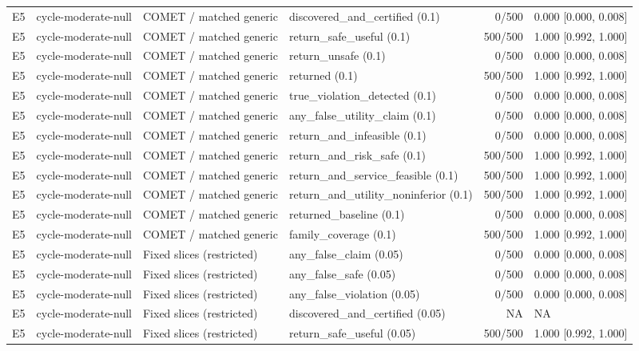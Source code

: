 \begin{longtable}{p{.04\linewidth}p{.18\linewidth}p{.19\linewidth}p{.16\linewidth}r p{.21\linewidth}}
E5 & cycle-moderate-null & COMET / matched generic & discovered\_and\_certified (0.1) & 0/500 & 0.000 [0.000, 0.008]\\
E5 & cycle-moderate-null & COMET / matched generic & return\_safe\_useful (0.1) & 500/500 & 1.000 [0.992, 1.000]\\
E5 & cycle-moderate-null & COMET / matched generic & return\_unsafe (0.1) & 0/500 & 0.000 [0.000, 0.008]\\
E5 & cycle-moderate-null & COMET / matched generic & returned (0.1) & 500/500 & 1.000 [0.992, 1.000]\\
E5 & cycle-moderate-null & COMET / matched generic & true\_violation\_detected (0.1) & 0/500 & 0.000 [0.000, 0.008]\\
E5 & cycle-moderate-null & COMET / matched generic & any\_false\_utility\_claim (0.1) & 0/500 & 0.000 [0.000, 0.008]\\
E5 & cycle-moderate-null & COMET / matched generic & return\_and\_infeasible (0.1) & 0/500 & 0.000 [0.000, 0.008]\\
E5 & cycle-moderate-null & COMET / matched generic & return\_and\_risk\_safe (0.1) & 500/500 & 1.000 [0.992, 1.000]\\
E5 & cycle-moderate-null & COMET / matched generic & return\_and\_service\_feasible (0.1) & 500/500 & 1.000 [0.992, 1.000]\\
E5 & cycle-moderate-null & COMET / matched generic & return\_and\_utility\_noninferior (0.1) & 500/500 & 1.000 [0.992, 1.000]\\
E5 & cycle-moderate-null & COMET / matched generic & returned\_baseline (0.1) & 0/500 & 0.000 [0.000, 0.008]\\
E5 & cycle-moderate-null & COMET / matched generic & family\_coverage (0.1) & 500/500 & 1.000 [0.992, 1.000]\\
E5 & cycle-moderate-null & Fixed slices (restricted) & any\_false\_claim (0.05) & 0/500 & 0.000 [0.000, 0.008]\\
E5 & cycle-moderate-null & Fixed slices (restricted) & any\_false\_safe (0.05) & 0/500 & 0.000 [0.000, 0.008]\\
E5 & cycle-moderate-null & Fixed slices (restricted) & any\_false\_violation (0.05) & 0/500 & 0.000 [0.000, 0.008]\\
E5 & cycle-moderate-null & Fixed slices (restricted) & discovered\_and\_certified (0.05) & NA & NA\\
E5 & cycle-moderate-null & Fixed slices (restricted) & return\_safe\_useful (0.05) & 500/500 & 1.000 [0.992, 1.000]\\

\end{longtable}
